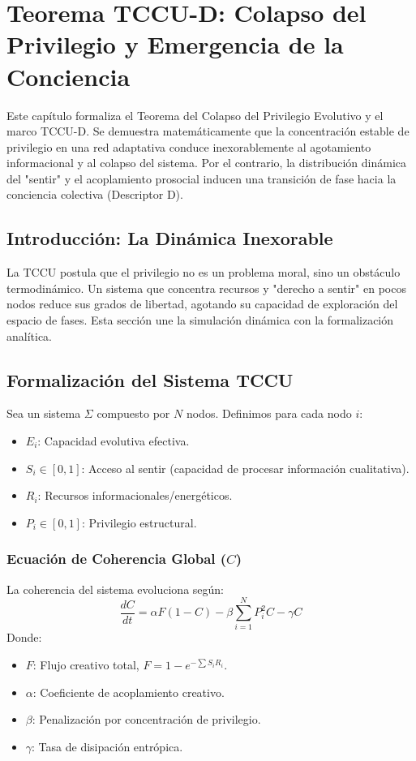 \chapter{Teorema TCCU-D: Colapso del Privilegio y Emergencia de la Conciencia}
\label{chap:teorema_d_colapso}

\begin{resumen}
Este capítulo formaliza el Teorema del Colapso del Privilegio Evolutivo y el marco TCCU-D. Se demuestra matemáticamente que la concentración estable de privilegio en una red adaptativa conduce inexorablemente al agotamiento informacional y al colapso del sistema. Por el contrario, la distribución dinámica del "sentir" y el acoplamiento prosocial inducen una transición de fase hacia la conciencia colectiva (Descriptor D).
\end{resumen}

\section{Introducción: La Dinámica Inexorable}
La TCCU postula que el privilegio no es un problema moral, sino un obstáculo termodinámico. Un sistema que concentra recursos y "derecho a sentir" en pocos nodos reduce sus grados de libertad, agotando su capacidad de exploración del espacio de fases. Esta sección une la simulación dinámica con la formalización analítica.

\section{Formalización del Sistema TCCU}
Sea un sistema $\Sigma$ compuesto por $N$ nodos. Definimos para cada nodo $i$:
\begin{itemize}
    \item $E_i$: Capacidad evolutiva efectiva.
    \item $S_i \in [0,1]$: Acceso al sentir (capacidad de procesar información cualitativa).
    \item $R_i$: Recursos informacionales/energéticos.
    \item $P_i \in [0,1]$: Privilegio estructural.
\end{itemize}

\subsection{Ecuación de Coherencia Global ($C$)}
La coherencia del sistema evoluciona según:
\begin{equation}
\frac{dC}{dt} = \alpha F (1 - C) - \beta \sum_{i=1}^N P_i^2 C - \gamma C
\end{equation}
Donde:
\begin{itemize}
    \item $F$: Flujo creativo total, $F = 1 - e^{-\sum S_i R_i}$.
    \item $\alpha$: Coeficiente de acoplamiento creativo.
    \item $\beta$: Penalización por concentración de privilegio.
    \item $\gamma$: Tasa de disipación entrópica.
\end{itemize}

